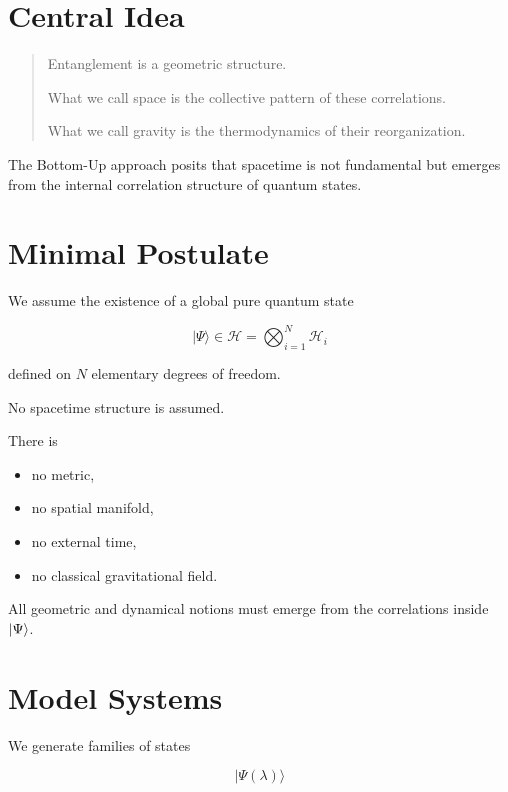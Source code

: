 \documentclass[11pt]{article}
\begin{document}

\section{Central Idea}

\begin{quote}
Entanglement is a geometric structure.

What we call space is the collective pattern of these correlations.

What we call gravity is the thermodynamics of their reorganization.
\end{quote}

The Bottom-Up approach posits that spacetime is not fundamental but emerges from the internal correlation structure of quantum states.

\section{Minimal Postulate}

We assume the existence of a global pure quantum state

\[
|\Psi\rangle \in \mathcal{H} = \bigotimes_{i=1}^{N} \mathcal{H}_i
\]

defined on $N$ elementary degrees of freedom.

No spacetime structure is assumed.

There is

\begin{itemize}
\item no metric,
\item no spatial manifold,
\item no external time,
\item no classical gravitational field.
\end{itemize}

All geometric and dynamical notions must emerge from the correlations inside $\ket{\Psi}$.

\section{Model Systems}

We generate families of states

\[
|\Psi(\lambda)\rangle
\]
\end{document}
